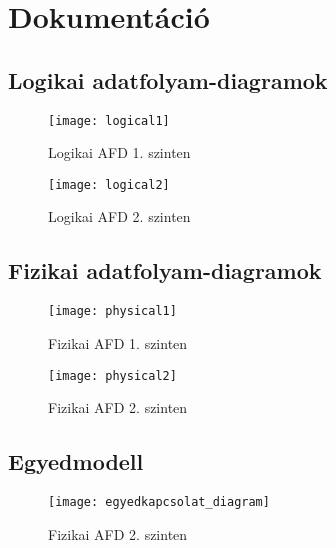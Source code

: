 \section{Dokumentáció}\label{sec:dokumentacio}

\subsection{Logikai adatfolyam-diagramok}

\begin{figure}[!htb]

    \centering
    \texttt{[image: logical1]}
    \caption{\label{fig:logical1}Logikai AFD 1. szinten}

\end{figure}

\begin{figure}[!htb]

    \centering
    \texttt{[image: logical2]}
    \caption{\label{fig:logical2}Logikai AFD 2. szinten}

\end{figure}
\pagebreak

\subsection{Fizikai adatfolyam-diagramok}

\begin{figure}[!htb]

    \centering
    \texttt{[image: physical1]}
    \caption{\label{fig:physical1}Fizikai AFD 1. szinten}

\end{figure}

\begin{figure}[!htb]

    \centering
    \texttt{[image: physical2]}
    \caption{\label{fig:physical2}Fizikai AFD 2. szinten}

\end{figure}
\pagebreak

\subsection{Egyedmodell}

\begin{figure}[!htb]

    \centering
    \texttt{[image: egyedkapcsolat\_diagram]}
    \caption{\label{fig:egyedkapcsolat_diagram}Fizikai AFD 2. szinten}

\end{figure}
\pagebreak

